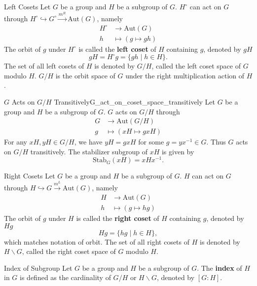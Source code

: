 \begin{definition}{Left Cosets}{}
    Let $G$ be a group and $H$ be a subgroup of $G$. $H^\circ$ can act on $G$ through $H^\circ\hookrightarrow G^\circ\stackrel{m^R}{\longrightarrow} \mathrm{Aut}(G)$, namely
    \begin{align*}
        H^\circ & \longrightarrow \mathrm{Aut}(G) \\
        h       & \longmapsto  (g\longmapsto gh)
    \end{align*}
    The orbit of $g$ under $H^\circ$ is called the \textbf{left coset} of $H$ containing $g$, denoted by $gH$
    \[
        gH = H^\circ g = \{ gh\mid h\in H\}.
    \]
    The set of all left cosets of $H$ is denoted by $G/H$, called the left coset space of $G$ modulo $H$. $G/H$ is the orbit space of $G$ under the right multiplication action of $H$.
\end{definition}

\begin{example}{$G$ Acts on $G/H$ Transitively}{G_act_on_coset_space_transitively}
    Let $G$ be a group and $H$ be a subgroup of $G$. $G$ acts on $G/H$ through
    \begin{align*}
        G & \longrightarrow \mathrm{Aut}(G/H) \\
        g & \longmapsto  (xH\longmapsto gxH)
    \end{align*}
    For any $xH,yH\in G/H$, we have $yH=gxH$ for some $g=yx^{-1}\in G$. Thus $G$ acts on $G/H$ transitively. The stabilizer subgroup of $xH$ is given by
    \[
        \mathrm{Stab}_G(xH)=xHx^{-1}.
    \]
\end{example}

\begin{definition}{Right Cosets}{}
    Let $G$ be a group and $H$ be a subgroup of $G$. $H$ can act on $G$ through $H\hookrightarrow G\stackrel{m^L}{\longrightarrow} \mathrm{Aut}(G)$, namely
    \begin{align*}
        H & \longrightarrow \mathrm{Aut}(G) \\
        h & \longmapsto  (g\longmapsto hg)
    \end{align*}
    The orbit of $g$ under $H$ is called the \textbf{right coset} of $H$ containing $g$, denoted by $Hg$
    \[
        Hg = \{ hg\mid h\in H\},
    \]
    which matches notation of orbit. The set of all right cosets of $H$ is denoted by $H\backslash G$, called the right coset space of $G$ modulo $H$.
\end{definition}

\begin{definition}{Index of Subgroup}{}
    Let $G$ be a group and $H$ be a subgroup of $G$. The \textbf{index} of $H$ in $G$ is defined as the cardinality of $G/H$ or $H\backslash G$, denoted by $[G:H]$.
\end{definition}

